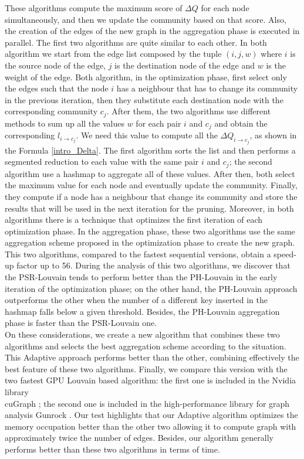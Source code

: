 These algorithms compute the maximum score of $\Delta Q$ for each node simultaneously, and then we update the community based on that score. Also, the creation of the edges of the new graph in the aggregation phase is executed in parallel. 
The first two algorithms are quite similar to each other. In both algorithm we start from the edge list composed by the tuple $(i,j,w)$ where $i$ is the source node of the edge, $j$ is the destination node of the edge and $w$ is the weight of the edge.
Both algorithm, in the optimization phase, first select only the edges such that the node $i$ has a neighbour that has to change its community in the previous iteration, then they substitute each destination node with the corresponding community $c_j$. After them, the two algorithms use different methods to sum up all the values $w$ for each pair $i$ and $c_j$ and obtain the corresponding $l_{i\rightarrow c_j}$. We need this value to compute all the $\Delta Q_{i \rightarrow c_j}$, as shown in the Formula \ref{intro_Delta}. The first algorithm sorts the list and then performs a segmented reduction to each value with the same pair $i$ and $c_j$; the second algorithm use a hashmap to aggregate all of these values. After then, both select the maximum value for each node and eventually update the community. Finally, they compute if a node has a neighbour that change its community and store the results that will be used in the next iteration for the pruning. Moreover, in both algorithms there is a technique that optimizes the first iteration of each optimization phase. In the aggregation phase, these two algorithms use the same aggregation scheme proposed in the optimization phase to create the new graph.\\
This two algorithms, compared to the fastest sequential versions, obtain a speed-up factor up to 56.
During the analysis of this two algorithms, we discover that the PSR-Louvain tends to perform better than the PH-Louvain in the early iteration of the optimization phase; on the other hand, the PH-Louvain approach outperforms the other when the number of a different key inserted in the hashmap falls below a given threshold. Besides, the PH-Louvain aggregation phase is faster than the PSR-Louvain one. \\
On these considerations, we create a new algorithm that combines these two algorithms and selects the best aggregation scheme according to the situation. This Adaptive approach performs better than the other, combining effectively the best feature of these two algorithms. Finally, we compare this version with the two fastest GPU Louvain based algorithm: the first one is included in the Nvidia library \\cuGraph \cite{cuGraph}; the second one is included in the high-performance library for graph analysis Gunrock \cite{gunrock}. Our test highlights that our Adaptive algorithm optimizes the memory occupation better than the other two allowing it to compute graph with approximately twice the number of edges. Besides, our algorithm generally performs better than these two algorithms in terms of time.\\
